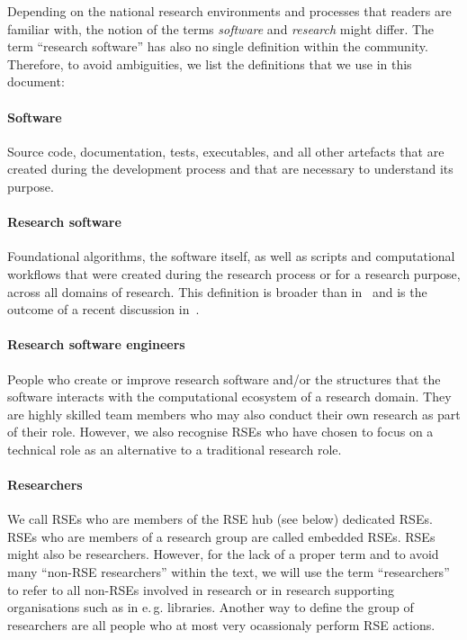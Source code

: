 \documentclass[a4paper]{article}
\makeatletter
\newcommand*{\eg}{e.\,g.\@\xspace}
\makeatother
\begin{document}
Depending on the national research environments and processes that readers are familiar with, the notion of the terms \emph{software} and \emph{research} might differ.
The term “research software” has also no single definition within the community.
Therefore, to avoid ambiguities, we list the definitions that we use in this document:
\paragraph{Software}
Source code, documentation, tests, executables, and all other artefacts that are created during the development process and that are necessary to understand its purpose.
\paragraph{Research software}
Foundational algorithms, the software itself, as well as scripts and computational workflows that were created
during the research process or for a research purpose, across all domains of research.
This definition is broader than in~\autocite{FAIR4RS} and is the outcome of a recent discussion in~\autocite{Gruenpeter2021}.
\paragraph{Research software engineers}
People who create or improve research software and/or the structures that the software interacts with the computational ecosystem of a research domain.
They are highly skilled team members who may also conduct their own research as part of their role.
However, we also recognise RSEs who have chosen to focus on a technical role as an alternative to a traditional research role.
\paragraph{Researchers}
We call RSEs who are members of the RSE hub (see below) dedicated RSEs.
RSEs who are members of a research group are called embedded RSEs.
RSEs might also be researchers.
However, for the lack of a proper term and to avoid many “non-RSE researchers” within the text, we will use the term “researchers” to refer to all non-RSEs involved in research or in research supporting organisations such as in \eg{} libraries.
Another way to define the group of researchers are all people who at most very ocassionaly perform RSE actions.
\end{document}
